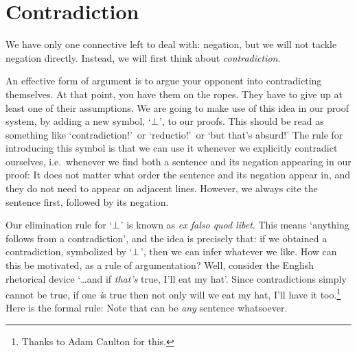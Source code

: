 \section{Contradiction}
We have only one connective left to deal with: negation, but we will not tackle negation directly. Instead, we will first think about \emph{contradiction}. 

An effective form of argument is to argue your opponent into contradicting themselves. At that point, you have them on the ropes. They have to give up at least one of their assumptions. We are going to make use of this idea in our proof system, by adding a new symbol, `$\bot$', to our proofs. This should be read as something like `contradiction!'\ or `reductio!'\ or `but that's absurd!'  The rule for introducing this symbol is that we can use it whenever we explicitly contradict ourselves, i.e.\ whenever we find both a sentence and its negation appearing in our proof:
It does not matter what order the sentence and its negation appear in, and they do not need to appear on adjacent lines. However, we always cite the sentence first, followed by its negation. 

Our elimination rule for `$\bot$' is known as \emph{ex falso quod libet}. This means `anything follows from a contradiction', and the idea is precisely that: if we obtained a contradiction, symbolized by `$\bot$', then we can infer whatever we like. How can this be motivated, as a rule of argumentation? Well, consider the English rhetorical device `\ldots and if \emph{that's} true, I'll eat my hat'. Since contradictions simply cannot be true, if one \emph{i}s true then not only will we eat my hat, I'll have it too.\footnote{Thanks to Adam Caulton for this.} Here is the formal rule:
Note that  can be \emph{any} sentence whatsoever. 

